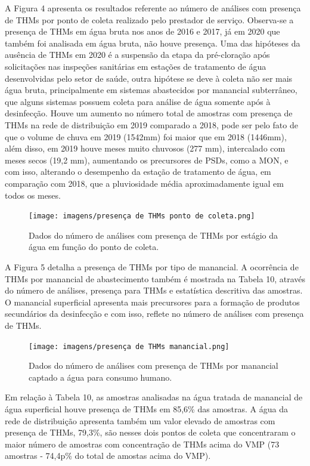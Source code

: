 A Figura 4 apresenta os resultados referente ao número de análises com presença de THMs por ponto de coleta realizado pelo prestador de serviço. Observa-se a presença de THMs em água bruta nos anos de 2016 e 2017, já em 2020 que também foi analisada em água bruta, não houve presença. Uma das hipóteses da ausência de THMs em 2020 é a suspensão da etapa da pré-cloração após solicitações nas inspeções sanitárias em estações de tratamento de água desenvolvidas pelo setor de saúde, outra hipótese se deve à coleta não ser mais água bruta, principalmente em sistemas abastecidos por manancial subterrâneo, que alguns sistemas possuem coleta para análise de água somente após à desinfecção. Houve um aumento no número total de amostras com presença de THMs na rede de distribuição em 2019 comparado a 2018, pode ser pelo fato de que o volume de chuva em 2019 (1542mm) foi maior que em 2018 (1446mm), além disso, em 2019 houve meses muito chuvosos (277 mm), intercalado com meses secos (19,2 mm), aumentando os precursores de PSDs, como a MON, e com isso, alterando o desempenho da estação de tratamento de água, em comparação com 2018, que a pluviosidade média aproximadamente igual em todos os meses. 


\begin{figure}[h]
\centering
\caption{\small Dados do número de análises com presença de THMs por estágio da água em função do ponto de coleta.}
\texttt{[image: imagens/presença de THMs ponto de coleta.png]}
\label{fig03}
\end{figure}

A Figura 5 detalha a presença de THMs por tipo de manancial. A ocorrência de THMs por manancial de abastecimento também é mostrada na Tabela 10, através do número de análises, presença para THMs e estatística descritiva das amostras. O manancial superficial apresenta mais precursores para a formação de produtos secundários da desinfecção e com isso, reflete no número de análises com presença de THMs. 

\begin{figure}[h]
\centering
\caption{\small Dados do número de análises com presença de THMs por manancial captado a água para consumo humano.}
\texttt{[image: imagens/presença de THMs manancial.png]}
\label{fig03}
\end{figure}

\newpage
Em relação à Tabela 10, as amostras analisadas na água tratada de manancial de água superficial houve presença de THMs em  85,6\% das amostras. A água da rede de distribuição apresenta também um valor elevado de amostras com presença de THMs, 79,3\%, são nesses dois pontos de coleta que concentraram o maior número  de amostras com concentração de THMs acima do VMP (73 amostras - 74,4p\% do total de amostas acima do VMP). 

